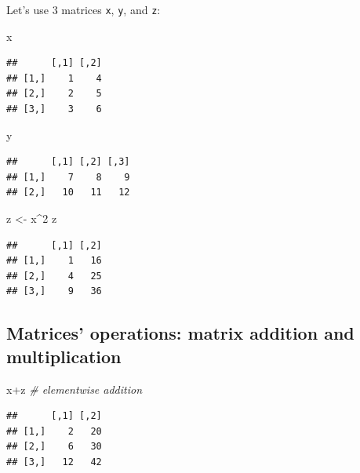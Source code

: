 \documentclass[
  11pt,
]{book}
\newenvironment{Shaded}{\begin{snugshade}}{\end{snugshade}}
\newcommand{\CommentTok}[1]{\textcolor[rgb]{0.56,0.35,0.01}{\textit{#1}}}
\newcommand{\DecValTok}[1]{\textcolor[rgb]{0.00,0.00,0.81}{#1}}
\newcommand{\NormalTok}[1]{#1}
\newcommand{\OtherTok}[1]{\textcolor[rgb]{0.56,0.35,0.01}{#1}}
\newcommand{\SpecialCharTok}[1]{\textcolor[rgb]{0.00,0.00,0.00}{#1}}
\begin{document}
Let's use 3 matrices \texttt{x}, \texttt{y}, and \texttt{z}:

\begin{Shaded}
\begin{Highlighting}[]
\NormalTok{x}
\end{Highlighting}
\end{Shaded}

\begin{verbatim}
##      [,1] [,2]
## [1,]    1    4
## [2,]    2    5
## [3,]    3    6
\end{verbatim}

\begin{Shaded}
\begin{Highlighting}[]
\NormalTok{y}
\end{Highlighting}
\end{Shaded}

\begin{verbatim}
##      [,1] [,2] [,3]
## [1,]    7    8    9
## [2,]   10   11   12
\end{verbatim}

\begin{Shaded}
\begin{Highlighting}[]
\NormalTok{z }\OtherTok{\textless{}{-}}\NormalTok{ x}\SpecialCharTok{\^{}}\DecValTok{2}
\NormalTok{z}
\end{Highlighting}
\end{Shaded}

\begin{verbatim}
##      [,1] [,2]
## [1,]    1   16
## [2,]    4   25
## [3,]    9   36
\end{verbatim}

\hypertarget{matrices-operations-matrix-addition-and-multiplication}{%
\subsection{Matrices' operations: matrix addition and multiplication}\label{matrices-operations-matrix-addition-and-multiplication}}

\begin{Shaded}
\begin{Highlighting}[]
\NormalTok{x}\SpecialCharTok{+}\NormalTok{z   }\CommentTok{\# elementwise addition}
\end{Highlighting}
\end{Shaded}

\begin{verbatim}
##      [,1] [,2]
## [1,]    2   20
## [2,]    6   30
## [3,]   12   42
\end{verbatim}
\end{document}
